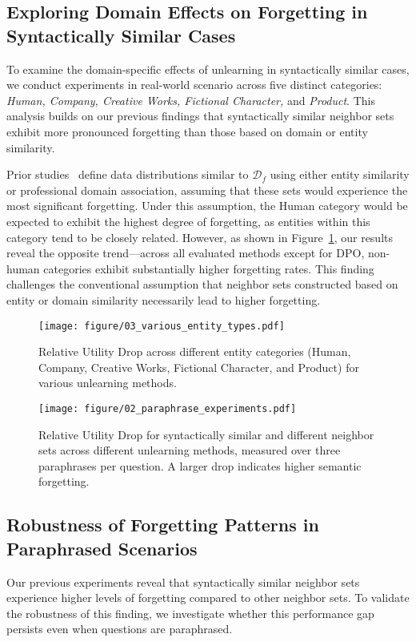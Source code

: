 \subsection{Exploring Domain Effects on Forgetting in Syntactically Similar Cases}
\label{sec:5_2}
To examine the domain-specific effects of unlearning in syntactically similar cases, we conduct experiments in real-world scenario across five distinct categories: \textit{Human, Company, Creative Works, Fictional Character,} and \textit{Product}. This analysis builds on our previous findings that syntactically similar neighbor sets exhibit more pronounced forgetting than those based on domain or entity similarity.

Prior studies~\cite{rwku,maini2024tofu} define data distributions similar to $\mathcal{D}_f$ using either entity similarity or professional domain association, assuming that these sets would experience the most significant forgetting. Under this assumption, the Human category would be expected to exhibit the highest degree of forgetting, as entities within this category tend to be closely related. However, as shown in Figure~\ref{fig:variousfig}, our results reveal the opposite trend—across all evaluated methods except for DPO, non-human categories exhibit substantially higher forgetting rates. This finding challenges the conventional assumption that neighbor sets constructed based on entity or domain similarity necessarily lead to higher forgetting.
\begin{figure}[t]
    \centering
    \texttt{[image: figure/03\_various\_entity\_types.pdf]}
    \caption{Relative Utility Drop across different entity categories (Human, Company, Creative Works, Fictional Character, and Product) for various unlearning methods.}
    \label{fig:variousfig}
\end{figure}
\begin{figure}[t]
    \centering
    \texttt{[image: figure/02\_paraphrase\_experiments.pdf]}
    \caption{Relative Utility Drop for syntactically similar and different neighbor sets across different unlearning methods, measured over three paraphrases per question. A larger drop indicates higher semantic forgetting.}
    \label{fig:paraphrasefig}
\end{figure}
\subsection{Robustness of Forgetting Patterns in Paraphrased Scenarios}
\label{sec:5_3}
Our previous experiments reveal that syntactically similar neighbor sets experience higher levels of forgetting compared to other neighbor sets. To validate the robustness of this finding, we investigate whether this performance gap persists even when questions are paraphrased. 

